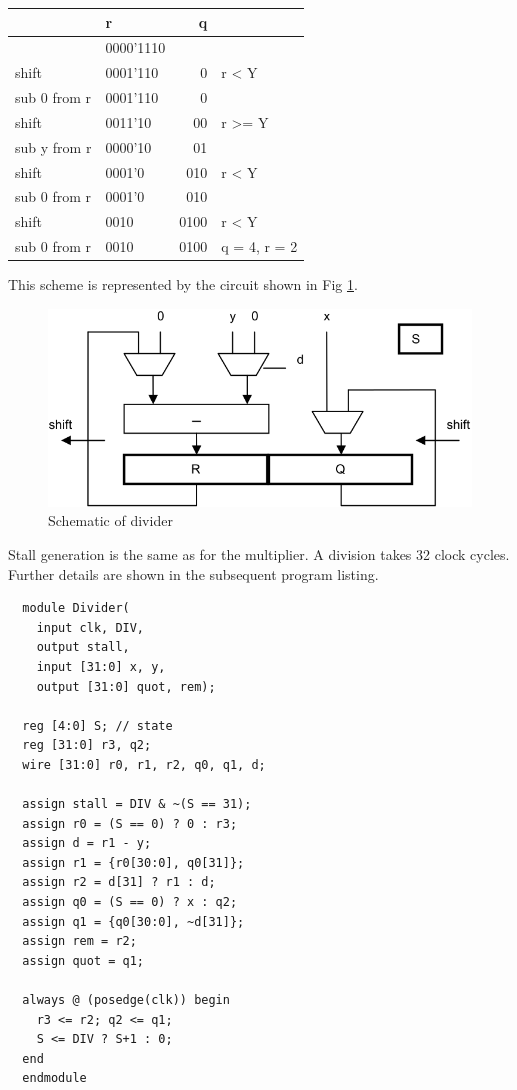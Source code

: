 \begin{table}[h!]
  \centering
  \begin{tabular}{l l r l}
                 & r         &    q \\\hline
                 & 0000'1110 &      \\
    shift        & 0001'110  &    0 & r < Y \\
    sub 0 from r & 0001'110  &    0 \\
    shift        & 0011'10   &   00 & r >= Y \\
    sub y from r & 0000'10   &   01 \\
    shift        & 0001'0    &  010 & r < Y \\
    sub 0 from r & 0001'0    &  010 \\
    shift        & 0010      & 0100 & r < Y \\
    sub 0 from r & 0010      & 0100 & q = 4, r = 2
  \end{tabular}
\end{table}

This scheme is represented by the circuit shown in Fig \ref{fig:divider}.

\begin{figure}[h!]
	\centering
	\includegraphics[width=.9\textwidth]{i/F/5.png}
	\caption{Schematic of divider}
	\label{fig:divider}
\end{figure}

Stall generation is the same as for the multiplier. A division takes 32 clock cycles. Further details
are shown in the subsequent program listing.

\begin{verbatim}
  module Divider(
    input clk, DIV,
    output stall,
    input [31:0] x, y,
    output [31:0] quot, rem);
 
  reg [4:0] S; // state
  reg [31:0] r3, q2;
  wire [31:0] r0, r1, r2, q0, q1, d;
 
  assign stall = DIV & ~(S == 31);
  assign r0 = (S == 0) ? 0 : r3;
  assign d = r1 - y;
  assign r1 = {r0[30:0], q0[31]};
  assign r2 = d[31] ? r1 : d;
  assign q0 = (S == 0) ? x : q2;
  assign q1 = {q0[30:0], ~d[31]};
  assign rem = r2;
  assign quot = q1;
  
  always @ (posedge(clk)) begin
    r3 <= r2; q2 <= q1;
    S <= DIV ? S+1 : 0;
  end
  endmodule
\end{verbatim}

